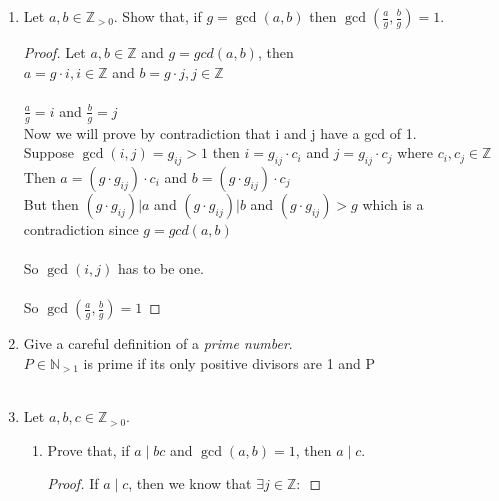 \documentclass[11pt]{article}
\def\Z{\mathbb{Z}}
\def\N{\mathbb{N}}
\begin{document}
\begin{enumerate}

\item Let $a, b \in \Z_{ >0 }$.
Show that, if $g = \gcd(a,b)$ then $\gcd(\frac a g, \frac b g) = 1$.

\begin{proof}
    Let $a, b \in \Z$ and $g = gcd(a,b)$, then \\

    $a = g \cdot i, i \in \Z$ and $b = g \cdot j, j \in \Z$ \\ \\
    $\frac{a}{g}= i$ and $\frac{b}{g} = j$ \\

    Now we will prove by contradiction that i and j have a gcd of 1. \\

    Suppose $\gcd(i, j) = g_{ij} > 1$ then $i = g_{ij} \cdot c_i$ and $j = g_{ij} \cdot c_j$ where $ c_i, c_j \in \Z$ \\

    Then $a = (g \cdot g_{ij}) \cdot c_i$ and $b = (g \cdot g_{ij}) \cdot c_j$ \\

    But then $(g \cdot g_{ij}) | a$ and $(g \cdot g_{ij}) | b$ and
    $(g \cdot g_{ij}) > g$ which is a contradiction since $g = gcd(a,b)$ \\ \\
    So $\gcd(i,j)$ has to be one. \\ \\
    So $\gcd(\frac{a}{g}, \frac{b}{g}) = 1$
\end{proof}
\item Give a careful definition of a \emph{prime number}.\\
$P \in \N_{ >1 }$ is prime if its only positive divisors are  1  and P\\\\
\item Let $a, b, c \in \Z_{ >0 }$.
  \begin{enumerate}
  \item Prove that, if $a \mid bc$ and $\gcd(a,b) = 1$, then $a \mid c$.
   \begin{proof}
If $a\mid c$, then we know that $\exists j \in \Z :$ \newline


\end{proof}
\end{enumerate}
\end{enumerate}
\end{document}
